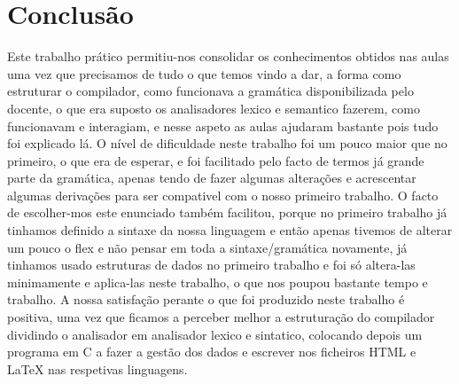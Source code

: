 \documentclass{report}
\begin{document}
\chapter{Conclusão}

Este trabalho prático permitiu-nos consolidar os conhecimentos obtidos nas aulas uma vez que precisamos de tudo o que temos vindo a dar, a forma como estruturar o compilador, como funcionava a gramática disponibilizada pelo docente, o que era suposto os analisadores lexico e semantico fazerem, como funcionavam e interagiam, e nesse aspeto as aulas ajudaram bastante pois tudo foi explicado lá.
O nível de dificuldade neste trabalho foi um pouco maior que no primeiro, o que era de esperar, e foi facilitado pelo facto de termos já grande parte da gramática, apenas tendo de fazer algumas alterações e acrescentar algumas derivações para ser compativel com o nosso primeiro trabalho.
O facto de escolher-mos este enunciado também facilitou, porque no primeiro trabalho já tinhamos definido a sintaxe da nossa linguagem e então apenas tivemos de alterar um pouco o flex e não pensar em toda a sintaxe/gramática novamente, já tinhamos usado estruturas de dados no primeiro trabalho e foi só altera-las minimamente e aplica-las neste trabalho, o que nos poupou bastante tempo e trabalho.
A nossa satisfação perante o que foi produzido neste trabalho é positiva, uma vez que ficamos a perceber melhor a estruturação do compilador dividindo o analisador em analisador lexico e sintatico, colocando depois um programa em C a fazer a gestão dos dados e escrever nos ficheiros HTML e LaTeX nas respetivas linguagens. 
\end{document}
